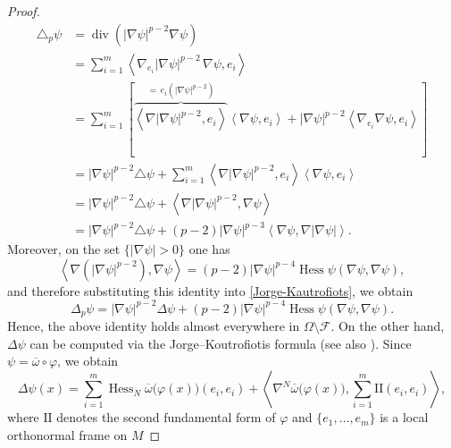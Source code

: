 \documentclass{article}
\begin{document}
\begin{proof}
\begin{equation}
\begin{aligned}\label{Jorge-Kautrofiots}
    \triangle_p \psi &= \operatorname{div} \left( |\nabla \psi|^{p-2} \nabla \psi  \right) \\
&= \sum_{i=1}^m \left\langle \nabla_{e_i} |\nabla \psi|^{p-2}\,\nabla \psi, e_i \right\rangle \\
&= \sum_{i=1}^m  \left[ \overbrace{ \left\langle  \nabla |\nabla \psi|^{p-2}, e_i \right\rangle}^{=\, e_i \left( |\nabla \psi|^{p-2}\right)} \left\langle \nabla \psi, e_i \right\rangle + |\nabla \psi|^{p-2} \left\langle \nabla_{e_i}\nabla \psi, e_i \right\rangle \right] \\
&= |\nabla \psi|^{p-2} \triangle \psi + \sum_{i=1}^m \left\langle  \nabla |\nabla \psi|^{p-2}, e_i \right\rangle \left\langle \nabla \psi, e_i \right\rangle \\
&= |\nabla \psi|^{p-2} \triangle \psi + \left\langle  \nabla |\nabla \psi|^{p-2},
\nabla \psi \right\rangle \\
&= |\nabla \psi|^{p-2} \triangle \psi + (p-2)|\nabla \psi|^{p-3} \left\langle 
\nabla \psi, \nabla |\nabla \psi| \right\rangle.
\end{aligned}
\end{equation}
Moreover, on the set $\{|\nabla\psi|>0\}$ one has 
\[\left\langle \nabla\!\left(|\nabla \psi|^{p-2}\right), \nabla \psi \right\rangle
=(p-2)|\nabla \psi|^{p-4}\operatorname{Hess}\psi(\nabla \psi, \nabla \psi),\] 
and therefore substituting this identity into \eqref{Jorge-Kautrofiots}, we obtain 
\begin{equation}\label{jorgekaushess}
\Delta_p \psi = |\nabla \psi|^{p-2}\Delta \psi
+(p-2)|\nabla \psi|^{p-4}\operatorname{Hess}\psi(\nabla \psi, \nabla \psi).   
\end{equation}
Hence, the above identity holds almost everywhere in $\Omega\setminus\mathcal F$. On the other hand, $\Delta\psi$ can be computed via the Jorge--Koutrofiotis formula
\cite[p. 13]{JorgeKoutrofiotis1981} (see also \cite{BessaMontenegro2003}). Since $\psi=\overline{\omega}\circ\varphi$, we obtain
\begin{equation}\label{eq:JK-Laplacian}
\Delta\psi(x) = \sum_{i=1}^m \operatorname{Hess}_N \overline{\omega}\big(\varphi(x)\big)(e_i,e_i)
+ \left\langle \nabla^N \overline{\omega}\big(\varphi(x)\big),\sum_{i=1}^m \mathrm{I}\mathrm{I}(e_i,e_i)\right\rangle,
\end{equation}
where $\mathrm{I}\mathrm{I}$ denotes the second fundamental form of $\varphi$ and $\{e_1,\dots,e_m\}$ is a local orthonormal frame on $M$

\end{proof}
\end{document}
